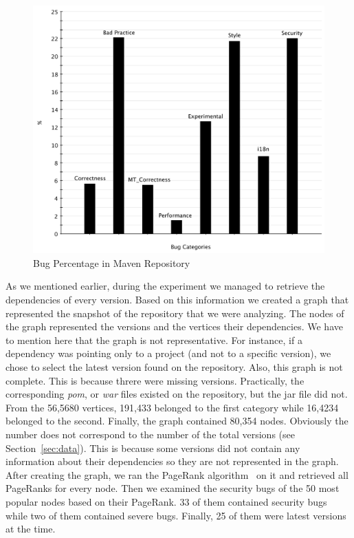 \documentclass[conference]{IEEEtran}
\begin{document}
\begin{figure}
	\centering
	\includegraphics[scale=0.6]{bug_percent}
	\caption{Bug Percentage in Maven Repository}
	\label{fig:bug-per} 
\end{figure}

As we mentioned earlier, during the experiment we managed to retrieve the
dependencies of every version. Based on this information we created a graph
that represented the snapshot of the repository that we were analyzing. The
nodes of the graph represented the versions and the vertices their dependencies.
We have to mention here that the graph is not representative. For instance, if
a dependency was pointing only to a project (and not to a specific version), we chose to
select the latest version found on the repository. Also, this graph is not
complete. This is because threre were missing versions.
Practically, the corresponding {\it pom}, or {\it war} files existed on the
repository, but the {\sc jar} file did not. From the 56,5680 vertices, 191,433
belonged to the first category while 16,4234 belonged to the second. Finally,
the graph contained 80,354 nodes. Obviously the number does not correspond to
the number of the total versions (see Section~\ref{sec:data}). This is because
some versions did not contain any information about their dependencies so they
are not represented in the graph. After creating the graph, we ran the PageRank
algorithm~\cite{BP98} on it and retrieved all PageRanks for every node. Then we
examined the security bugs of the 50 most popular nodes based on their PageRank.
33 of them contained security bugs while two of them contained severe bugs.
Finally, 25 of them were latest versions at the time.
\end{document}
